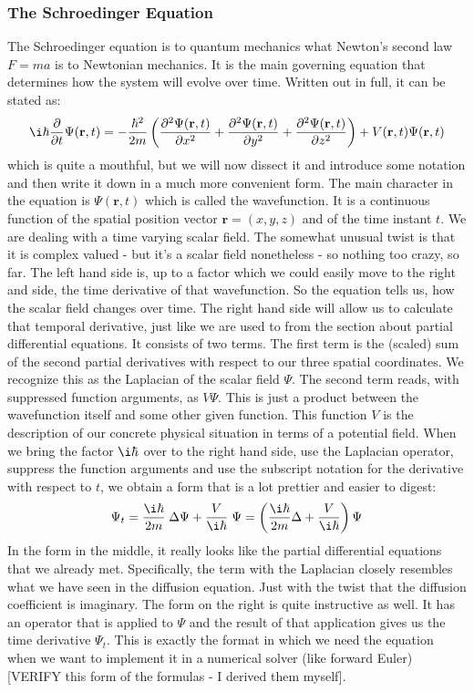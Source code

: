 \subsubsection{The Schroedinger Equation}
The  Schroedinger equation is to quantum mechanics what Newton's second law $F = m a$ is to Newtonian mechanics. It is the main governing equation that determines how the system will evolve over time. Written out in full, it can be stated as:
\begin{equation}
 \i \hbar \frac{\partial}{\partial t} \Psi(\mathbf{r}, t) =
 - \frac{\hbar^2}{2m} \left(
 \frac{\partial^2 \Psi(\mathbf{r}, t)}{\partial x^2} + 
 \frac{\partial^2 \Psi(\mathbf{r}, t)}{\partial y^2} + 
 \frac{\partial^2 \Psi(\mathbf{r}, t)}{\partial z^2}
 \right)
 +
 V(\mathbf{r}, t) \Psi(\mathbf{r}, t)
\end{equation}
which is quite a mouthful, but we will now dissect it and introduce some notation and then write it down in a much more convenient form. The main character in the equation is $\Psi(\mathbf{r}, t)$ which is called the wavefunction. It is a continuous function of the spatial position vector $\mathbf{r} = (x,y,z)$ and of the time instant $t$. We are dealing with a time varying scalar field. The somewhat unusual twist is that it is complex valued - but it's a scalar field nonetheless - so nothing too crazy, so far. The left hand side is, up to a factor which we could easily move to the right and side, the time derivative of that wavefunction. So the equation tells us, how the scalar field changes over time. The right hand side will allow us to calculate that temporal derivative, just like we are used to from the section about partial differential equations. It consists of two terms. The first term is the (scaled) sum of the second partial derivatives with respect to our three spatial coordinates. We recognize this as the Laplacian of the scalar field $\Psi$. The second term reads, with suppressed function arguments, as $V \Psi$. This is just a product between the wavefunction itself and some other given function. This function $V$ is the description of our concrete physical situation in terms of a potential field. When we bring the factor $\i \hbar$ over to the right hand side, use the Laplacian operator, suppress the function arguments and use the subscript notation for the derivative with respect to $t$, we obtain a form that is a lot prettier and easier to digest:
\begin{equation}
\Psi_t = \frac{\i \hbar}{2m} \; \Delta \Psi + \frac{V}{\i \hbar} \; \Psi
       = \left(\frac{\i \hbar}{2m} \Delta  + \frac{V}{\i \hbar} \right)  \Psi
\end{equation}
In the form in the middle, it really looks like the partial differential equations that we already met. Specifically, the term with the Laplacian closely resembles what we have seen in the diffusion equation. Just with the twist that the diffusion coefficient is imaginary. The form on the right is quite instructive as well. It has an operator that is applied to $\Psi$ and the result of that application gives us the time derivative $\Psi_t$. This is exactly the format in which we need the equation when we want to implement it in a numerical solver (like forward Euler) [VERIFY this form of the formulas - I derived them myself].

